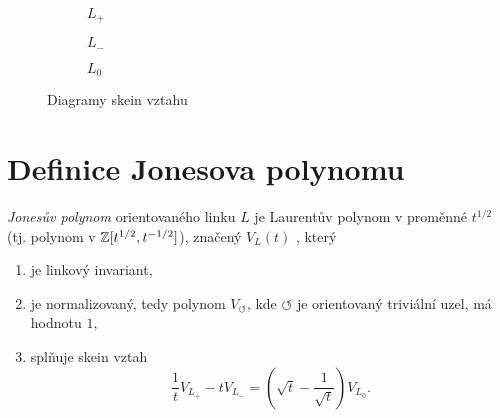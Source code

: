 \begin{figure}[h]  
\centering 
\begin{subfigure}[t]{0.4\linewidth}\centering
{} 
\caption{$L_+$} 
\end{subfigure}
\begin{subfigure}[t]{0.4\linewidth}\centering
{}  
\caption{$L_-$}
\end{subfigure}
\begin{subfigure}[t]{0.4\linewidth}\centering
{}
\caption{$L_0$}
\end{subfigure}
\caption{Diagramy skein vztahu} \label{skein}
\end{figure}

\section{Definice Jonesova polynomu}

\begin{definice}\label{def01:1}
\emph{Jonesův polynom} orientovaného linku $L$ je Laurentův polynom v proměnné $t^{1/2}$ (tj. polynom v $\mathbb{Z}[t^{1/2}, t^{-1/2}]$), značený $V_L(t)$ , který
\begin{enumerate}
\item
je linkový invariant,
\item 
  je normalizovaný, tedy polynom  $V_\circlearrowleft$, kde $\circlearrowleft$ je orientovaný triviální uzel, má hodnotu $1,$
\item  
splňuje skein vztah 
\begin{equation} \label{skein}
\frac{1}{t} V_{L_+} - t V_{L_-} = \left( \sqrt{t}  - \frac{1}{\sqrt{t}}\right) V_{L_0}.
\end{equation}
\end{enumerate}
\end{definice}

